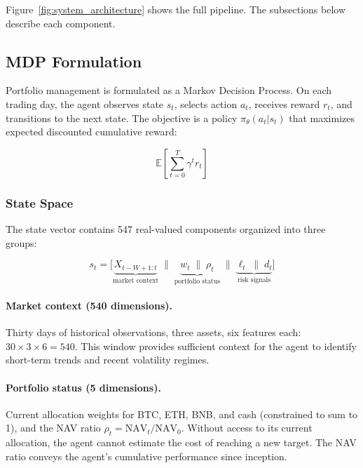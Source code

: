 \documentclass[pdflatex,sn-mathphys-num]{sn-jnl}
\begin{document}
Figure~\ref{fig:system_architecture} shows the full pipeline. The subsections
below describe each component.

\subsection{MDP Formulation}

Portfolio management is formulated as a Markov Decision Process. On each
trading day, the agent observes state $s_t$, selects action $a_t$, receives
reward $r_t$, and transitions to the next state. The objective is a policy
$\pi_\theta(a_t | s_t)$ that maximizes expected discounted cumulative reward:

\begin{equation}
    \mathbb{E}\left[\sum_{t=0}^{T} \gamma^t r_t\right]
\end{equation}

\subsubsection{State Space}\label{sec:state}

The state vector contains 547 real-valued components organized into three
groups:

\begin{equation}\label{eq:state}
    s_t = \Big[\underbrace{X_{t-W+1:t}}_{\text{market context}} \;\Big\|\;
              \underbrace{w_t \;\|\; \rho_t}_{\text{portfolio status}} \;\Big\|\;
              \underbrace{\ell_t \;\|\; d_t}_{\text{risk signals}}\Big]
\end{equation}

\paragraph{Market context (540 dimensions).}
Thirty days of historical observations, three assets, six features each:
$30 \times 3 \times 6 = 540$. This window provides sufficient context for the
agent to identify short-term trends and recent volatility regimes.

\paragraph{Portfolio status (5 dimensions).}
Current allocation weights for BTC, ETH, BNB, and cash (constrained to sum
to 1), and the NAV ratio $\rho_t = \mathrm{NAV}_t / \mathrm{NAV}_0$.
Without access to its current allocation, the agent cannot estimate the cost
of reaching a new target. The NAV ratio conveys the agent's cumulative
performance since inception.
\end{document}
